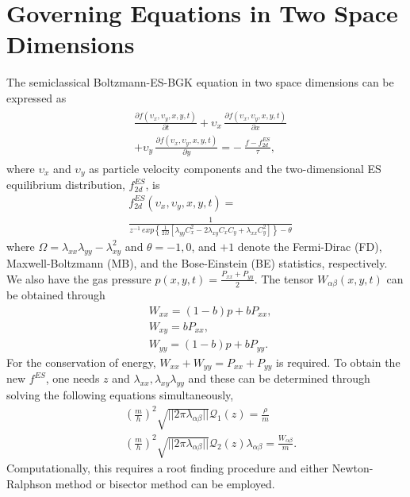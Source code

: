 \documentclass[twoside,twocolumn,prc,floats,amsmath,amssymb]{revtex4} %
\begin{document}
\section{Governing Equations in Two Space Dimensions}
\label{sec:3}
The semiclassical Boltzmann-ES-BGK equation in two space dimensions can be expressed as
\begin{align}
\begin{split}
&\frac{\partial f({\upsilon}_x,{\upsilon}_y, x, y, t)}{\partial t} + {\upsilon}_x\,\frac{\partial f({\upsilon}_x,{\upsilon}_y, x, y, t)}{\partial x } \\
&+{\upsilon}_y\,\frac{\partial f({\upsilon}_x,{\upsilon}_y, x, y, t)} {\partial y} =-\ \frac{f-f^{ES}_{2d}}{\tau },
\end{split}
\label{eq:normalized_B_ES_BGK}
\end{align}
where ${\upsilon}_x$ and ${\upsilon}_y$ as particle velocity components and the two-dimensional ES equilibrium distribution, $f^{ES}_{2d}$, is
\begin{equation}
\begin{split}
&f^{ES}_{2d}\left({\upsilon}_x,{\upsilon}_y, x, y, t\right) = \\
&\frac{1}{z^{-1}\,exp\left\{ \frac{1}{2 \Omega} \left[ \lambda_{yy} C_x^2 - 2 \lambda_{xy} C_x C_y + \lambda_{xx} C_y^2 \right]  \right\} - \theta }
\end{split}
\label{eq:normalized_ESBGK_PDF}
\end{equation}
where $\Omega = \lambda_{xx}  \lambda_{yy} - \lambda_{xy}^2$ and $\theta = -1, 0$, and $+1$ denote the Fermi-Dirac (FD), Maxwell-Boltzmann (MB), and the Bose-Einstein (BE) statistics, respectively. 
We also have the gas pressure $p(x,y,t) = \frac{P_{xx} + P_{yy}}{2}$.  The tensor $W_{\alpha \beta}(x,y,t)$ can be obtained through
\begin{subequations}
\begin{align}
&W_{xx} =(1-b)p + b P_{xx}, \\
&W_{xy} = b P_{xx}, \\
&W_{yy} = (1-b)p + bP_{yy}. 
\label{eq:pressure_tensor_variables}
\end{align}
\end{subequations}
For the conservation of energy, $W_{xx} +W_{yy} = P_{xx} + P_{yy}$ is required.
To obtain the new $f^{ES}$, one needs $z$ and $\lambda_{xx}, \lambda_{xy}\lambda_{yy}$ and these can be determined through solving the following equations simultaneously,
\begin{subequations}
\begin{align}
&(\frac{m}{h})^2 \sqrt{||2 \pi \lambda_{\alpha \beta} ||}\mathcal{Q}_{1}(z) = \frac{\rho}{m} \\
&(\frac{m}{h})^2 \sqrt{||2 \pi \lambda_{\alpha \beta} ||}\mathcal{Q}_{2}(z) \lambda_{\alpha \beta}= \frac{W_{\alpha \beta}}{m}.
\end{align}
\end{subequations}
Computationally, this requires a root finding procedure and either Newton-Ralphson method or bisector method can be employed.
\end{document}
